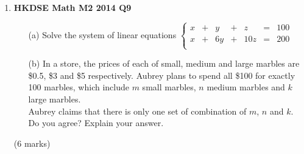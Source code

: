 \documentclass{report}
\begin{document}
\begin{enumerate}
	\item \textbf{HKDSE Math M2 2014 Q9}
	\begin{enumerate}
		\item [(a)]Solve the system of linear equations $\left\{
		\begin{matrix}
			x & + & y & + & z & = & 100\\
			x & + & 6y& + &10z& = & 200\\
		\end{matrix}\right.$
		\item [(b)]In a store, the prices of each of small, medium and large marbles are \$0.5, \$3 and \$5 respectively. Aubrey plans to spend all \$100 for exactly 100 marbles, which include $m$ small marbles, $n$ medium marbles and $k$ large marbles.\\
		Aubrey claims that there is only one set of combination of $m$, $n$ and $k$. Do you agree? Explain your answer.
	\end{enumerate}
	(6 marks)

	\newpage


\end{enumerate}
\end{document}
